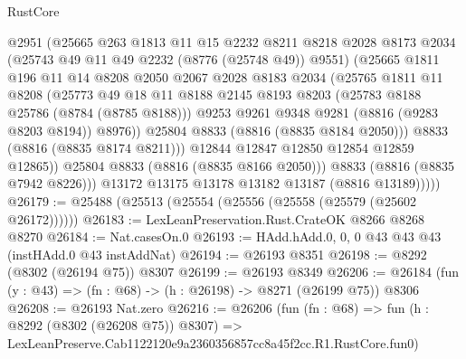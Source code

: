 \begin{lexlean}{RustCore}
\begin{coremodule}
                    @2951
                    (@25665
                      @263
                      @1813
                      @11
                      @15
                      @2232
                      @8211
                      @8218
                      @2028
                      @8173
                      @2034
                      (@25743 @49 @11 @49 @2232 (@8776 (@25748 @49)) @9551)
                      (@25665
                        @1811
                        @196
                        @11
                        @14
                        @8208
                        @2050
                        @2067
                        @2028
                        @8183
                        @2034
                        (@25765
                          @1811
                          @11
                          @8208
                          (@25773
                            @49
                            @18
                            @11
                            @8188
                            @2145
                            @8193
                            @8203
                            (@25783 @8188 @25786 (@8784 (@8785 @8188)))
                            @9253
                            @9261
                            @9348
                            @9281
                            (@8816 (@9283 @8203 @8194))
                            @8976))
                        @25804
                        @8833
                        (@8816 (@8835 @8184 @2050)))
                      @8833
                      (@8816 (@8835 @8174 @8211)))
                    @12844
                    @12847
                    @12850
                    @12854
                    @12859
                    @12865))
                @25804
                @8833
                (@8816 (@8835 @8166 @2050)))
              @8833
              (@8816 (@8835 @7942 @8226)))
            @13172
            @13175
            @13178
            @13182
            @13187
            (@8816 @13189)))))
@26179 := @25488 (@25513 (@25554 (@25556 (@25558 (@25579 (@25602 @26172))))))
@26183 := LexLeanPreservation.Rust.CrateOK @8266 @8268 @8270
@26184 := Nat.casesOn.{0}
@26193 := HAdd.hAdd.{0, 0, 0} @43 @43 @43 (instHAdd.{0} @43 instAddNat)
@26194 := @26193 @8351
@26198 := @8292 (@8302 (@26194 @75)) @8307
@26199 := @26193 @8349
@26206 := @26184 (fun (y : @43) => (fn : @68) -> (h : @26198) -> @8271 (@26199 @75)) @8306
@26208 := @26193 Nat.zero
@26216 := @26206
    (fun (fn : @68) =>
    fun (h : @8292 (@8302 (@26208 @75)) @8307) =>
    LexLeanPreserve.Cab1122120e9a2360356857cc8a45f2cc.R1.RustCore.fun0)

\end{coremodule}
\end{lexlean}
